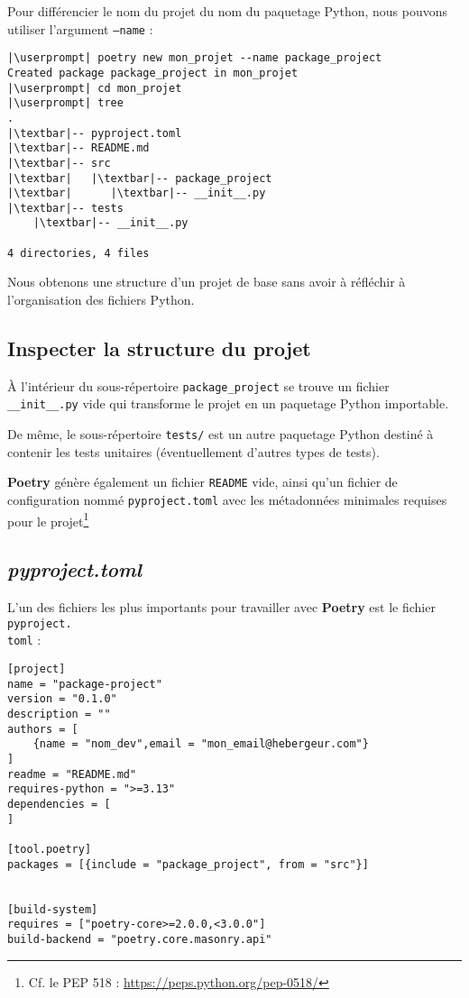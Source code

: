 Pour différencier le nom du projet du nom du paquetage Python, nous pouvons utiliser l'argument \texttt{--name} :
\begin{lstlisting}[style=bash]
|\userprompt| poetry new mon_projet --name package_project
Created package package_project in mon_projet
|\userprompt| cd mon_projet
|\userprompt| tree
.
|\textbar|-- pyproject.toml
|\textbar|-- README.md
|\textbar|-- src
|\textbar|   |\textbar|-- package_project
|\textbar|      |\textbar|-- __init__.py
|\textbar|-- tests
    |\textbar|-- __init__.py

4 directories, 4 files
\end{lstlisting}

Nous obtenons une structure d'un projet de base sans avoir à réfléchir à l'organisation des fichiers Python.

\subsection*{Inspecter la structure du projet}
À l'intérieur du sous-répertoire \texttt{package\_project} se trouve un fichier \texttt{\_\_init\_\_.py} vide qui transforme le projet en un paquetage Python importable.

De même, le sous-répertoire \texttt{tests/} est un autre paquetage Python destiné à contenir les tests unitaires (éventuellement d'autres types de tests).


\textbf{Poetry} génère également un fichier \texttt{README} vide, ainsi qu'un fichier de configuration nommé \texttt{pyproject.toml} avec les métadonnées minimales requises pour le projet\footnote{Cf. le PEP 518 : \url{https://peps.python.org/pep-0518/}}

\subsection*{\textit{pyproject.toml}}
L'un des fichiers les plus importants pour travailler avec \textbf{Poetry} est le fichier \texttt{pyproject.\\toml} :
\begin{lstlisting}[style=file]
[project]
name = "package-project"
version = "0.1.0"
description = ""
authors = [
    {name = "nom_dev",email = "mon_email@hebergeur.com"}
]
readme = "README.md"
requires-python = ">=3.13"
dependencies = [
]

[tool.poetry]
packages = [{include = "package_project", from = "src"}]


[build-system]
requires = ["poetry-core>=2.0.0,<3.0.0"]
build-backend = "poetry.core.masonry.api"
\end{lstlisting}

